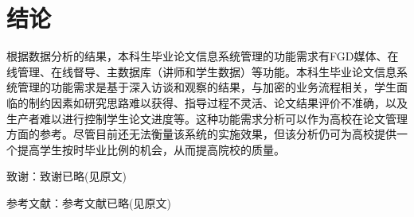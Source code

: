 \section{结论}

根据数据分析的结果，本科生毕业论文信息系统管理的功能需求有FGD媒体、在线管理、在线督导、主数据库（讲师和学生数据）等功能。本科生毕业论文信息系统管理的功能需求是基于深入访谈和观察的结果，与加密的业务流程相关，学生面临的制约因素如研究思路难以获得、指导过程不灵活、论文结果评价不准确，以及生产者难以进行控制学生论文进度等。这种功能需求分析可以作为高校在论文管理方面的参考。尽管目前还无法衡量该系统的实施效果，但该分析仍可为高校提供一个提高学生按时毕业比例的机会，从而提高院校的质量。



致谢：致谢已略(见原文)

参考文献：参考文献已略(见原文)